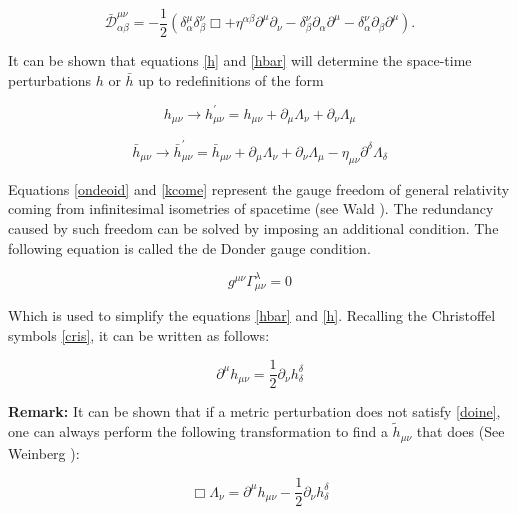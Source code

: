 \begin{equation}\label{Dbar}
\bar{\mathcal{D}}^{\mu\nu}_{\alpha \beta} = -\frac{1}{2}( \delta^{\mu}_{\alpha} \delta^{\nu}_{\beta} \Box + \eta^{\alpha \beta}\partial^{\mu}\partial_{\nu} - \delta^{\nu}_{\beta} \partial_{\alpha}\partial^{\mu} - \delta^{\nu}_{\alpha} \partial_{\beta}\partial^{\mu}).
\end{equation}


It can be shown that equations \ref{h} and \ref{hbar} will determine the space-time perturbations $h$ or $\bar{h}$ up to redefinitions of the form

\begin{equation}\label{ondeoid}
h_{\mu\nu} \rightarrow  h^{'}_{\mu\nu} = h_{\mu\nu} + \partial_{\mu} \Lambda_{\nu} + \partial_{\nu} \Lambda_{\mu} 
\end{equation}


\begin{equation}\label{kcome}
\bar{h}_{\mu\nu} \rightarrow  \bar{h}^{'}_{\mu\nu} = \bar{h}_{\mu\nu} + \partial_{\mu} \Lambda_{\nu} + \partial_{\nu} \Lambda_{\mu} - \eta_{\mu\nu} \partial^{\delta} \Lambda_{\delta}
\end{equation}

Equations \ref{ondeoid} and \ref{kcome} represent the gauge freedom of general relativity coming from infinitesimal isometries of spacetime (see Wald \cite{Wald:1984rg}). The redundancy caused by such freedom can be solved by imposing an additional condition. The following equation is called the de Donder gauge condition.

\begin{equation}
g^{\mu\nu} \Gamma^{\lambda}_{\mu\nu} = 0
\end{equation}

Which is used to simplify the equations \ref{hbar} and \ref{h}. Recalling the Christoffel symbols \ref{cris}, it can be written as follows:  

\begin{equation}\label{doine}
\partial^{\mu} h_{\mu\nu} = \frac{1}{2} \partial_{\nu} h^{\delta}_{\delta}
\end{equation}

\textbf{Remark:} It can be shown that if a metric perturbation does not satisfy \ref{doine}, one can always perform the following transformation to find a $\tilde{h}_{\mu\nu}$ that does (See Weinberg \cite[chapter 10]{Weinberg:1972kfs}):

\begin{equation}
\Box \Lambda_\nu = \partial^{\mu} h_{\mu\nu} - \frac{1}{2} \partial_{\nu} h^{\delta}_{\delta}
\end{equation} 

